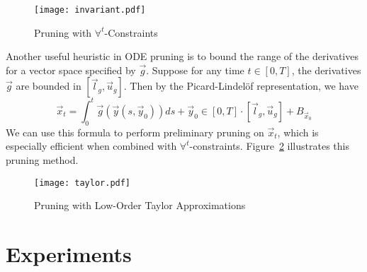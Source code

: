 \documentclass[12pt]{article}
\begin{document}
\begin{figure}
\begin{center}
\texttt{[image: invariant.pdf]}
\end{center}
\caption{Pruning with $\forall^t$-Constraints}\label{inv}
\end{figure}
Another useful heuristic in ODE pruning is to bound the range of the derivatives for a vector space specified by $\vec g$. Suppose for any time $t\in[0,T]$, the derivatives $\vec g$ are bounded in $[\vec l_g, \vec u_g]$. Then by the Picard-Lindel\"of representation, we have
$$\vec x_t = \int_{0}^t \vec g(\vec y(s,\vec y_0))ds + \vec y_0\in [0, T]\cdot [\vec l_g, \vec u_g]+B_{\vec x_0}$$
We can use this formula to perform preliminary pruning on $\vec x_t$, which is especially efficient when combined with $\forall^t$-constraints. Figure~\ref{taylor} illustrates this pruning method.
\begin{figure}
\begin{center}
\texttt{[image: taylor.pdf]}
\end{center}
\caption{Pruning with Low-Order Taylor Approximations}\label{taylor}
\end{figure}

\section{Experiments}\label{experiments}
\end{document}
